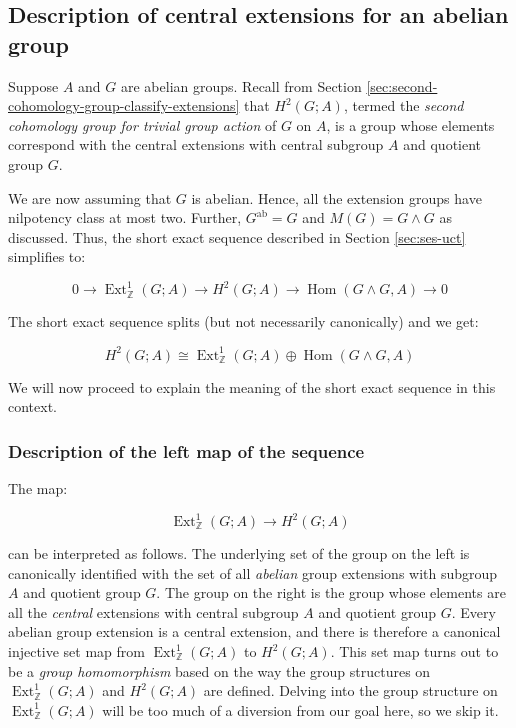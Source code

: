 \documentclass{ucetd}
\begin{document}
\subsection{Description of central extensions for an abelian group}\label{sec:ses-uct-abelian}

Suppose $A$ and $G$ are abelian groups. Recall from Section
\ref{sec:second-cohomology-group-classify-extensions} that $H^2(G;A)$,
termed the {\em second cohomology group for trivial group action} of
$G$ on $A$, is a group whose elements correspond with the central
extensions with central subgroup $A$ and quotient group $G$.

We are now assuming that $G$ is abelian. Hence, all the extension
groups have nilpotency class at most two. Further,
$G^{\operatorname{ab}} = G$ and $M(G) = G \wedge G$ as
discussed. Thus, the short exact sequence described in
Section \ref{sec:ses-uct} simplifies to:

\begin{equation}\label{eq:ses-uct-abelian}
  0 \to \operatorname{Ext}^1_{\mathbb{Z}}(G;A) \to H^2(G;A) \to \operatorname{Hom}(G \wedge G,A) \to 0
\end{equation}

The short exact sequence splits (but not necessarily canonically) and we get:

$$H^2(G;A) \cong \operatorname{Ext}^1_{\mathbb{Z}}(G;A) \oplus \operatorname{Hom}(G \wedge G,A)$$

We will now proceed to explain the meaning of the short exact sequence
in this context.

\subsubsection{Description of the left map of the sequence}\label{sec:ses-uct-abelian-left-map}

The map:

$$\operatorname{Ext}^1_{\mathbb{Z}}(G;A) \to H^2(G;A)$$

can be interpreted as follows. The underlying set of the group on the
left is canonically identified with the set of all {\em abelian} group
extensions with subgroup $A$ and quotient group $G$. The group on the
right is the group whose elements are all the {\em central} extensions
with central subgroup $A$ and quotient group $G$. Every abelian group
extension is a central extension, and there is therefore a canonical
injective set map from $\operatorname{Ext}^1_{\mathbb{Z}}(G;A)$ to
$H^2(G;A)$. This set map turns out to be a {\em group homomorphism}
based on the way the group structures on
$\operatorname{Ext}^1_{\mathbb{Z}}(G;A)$ and $H^2(G;A)$ are
defined. Delving into the group structure on
$\operatorname{Ext}^1_{\mathbb{Z}}(G;A)$ will be too much of a
diversion from our goal here, so we skip it.
\end{document}
